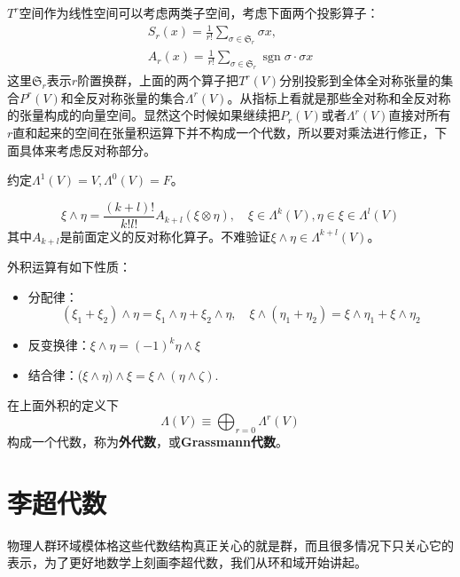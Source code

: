 $T^r$空间作为线性空间可以考虑两类子空间，考虑下面两个投影算子：
\begin{equation}
	\begin{gathered}
		S_{r}(x)={\frac{1}{r!}}\sum_{\sigma\in{\mathfrak{ S}_r}}\sigma{x}, \\
		A_{r}(x)={\frac{1}{r!}}\sum_{\sigma\in{\mathfrak{ S}_r}}\operatorname{sgn}\sigma\cdot\sigma x 
	\end{gathered}
\end{equation}
这里$\mathfrak{S}_r$表示$r$阶置换群，上面的两个算子把$T^r(V)$分别投影到全体全对称张量的集合$P^r(V)$和全反对称张量的集合$\Lambda^r(V)$。从指标上看就是那些全对称和全反对称的张量构成的向量空间。显然这个时候如果继续把$P_r(V)$或者$\Lambda^r(V)$直接对所有$r$直和起来的空间在张量积运算下并不构成一个代数，所以要对乘法进行修正，下面具体来考虑反对称部分。
\begin{remark}
	约定$\Lambda^{1}(V)=V,\Lambda^{0}(V)=F$。
\end{remark}
\begin{definition}[外积]
	\begin{equation}
		\xi\wedge\eta=\frac{(k+l)!}{k!l!}A_{k+l}(\xi\otimes\eta),\quad\xi\in\Lambda^k(V),\eta\in\xi\in\Lambda^l(V)
	\end{equation}
	其中$A_{k+l}$是前面定义的反对称化算子。不难验证$\xi\wedge\eta\in\Lambda^{k+l}(V)$。
\end{definition}
外积运算有如下性质：
\begin{itemize}
	\item 分配律：
	\[(\xi_{1}+\xi_{2})\wedge\eta=\xi_{1}\wedge\eta+\xi_{2}\wedge\eta,\quad \xi\wedge(\eta_{1}+\eta_{2})=\xi\wedge\eta_{1}+\xi\wedge\eta_{2}\]
	 \item 反变换律：$\xi\wedge\eta=(-1)^k\eta\wedge\xi$ 
	\item 结合律：($\xi\wedge\eta)\wedge\xi=\xi\wedge(\eta\wedge\zeta)$.
\end{itemize}
\begin{definition}[外代数]
	在上面外积的定义下\[\Lambda(V)\equiv\bigoplus_{r=0}\Lambda^r(V)\]构成一个代数，称为\textbf{外代数}，或\textbf{Grassmann代数}。
\end{definition}

\section{李超代数}
物理人群环域模体格这些代数结构真正关心的就是群，而且很多情况下只关心它的表示，为了更好地数学上刻画李超代数，我们从环和域开始讲起。

